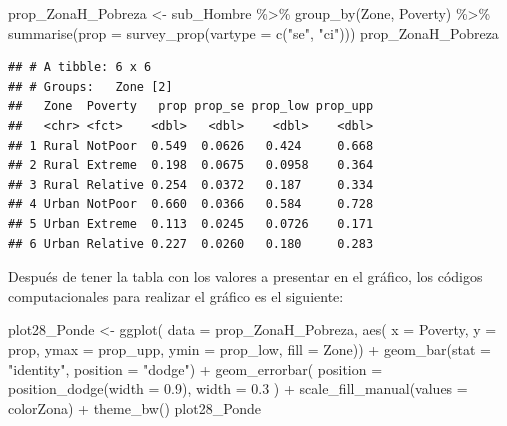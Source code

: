 \documentclass[
  12pt,
]{book}
\newenvironment{Shaded}{\begin{snugshade}}{\end{snugshade}}
\newcommand{\AttributeTok}[1]{\textcolor[rgb]{0.77,0.63,0.00}{#1}}
\newcommand{\FloatTok}[1]{\textcolor[rgb]{0.00,0.00,0.81}{#1}}
\newcommand{\FunctionTok}[1]{\textcolor[rgb]{0.00,0.00,0.00}{#1}}
\newcommand{\NormalTok}[1]{#1}
\newcommand{\OtherTok}[1]{\textcolor[rgb]{0.56,0.35,0.01}{#1}}
\newcommand{\SpecialCharTok}[1]{\textcolor[rgb]{0.00,0.00,0.00}{#1}}
\newcommand{\StringTok}[1]{\textcolor[rgb]{0.31,0.60,0.02}{#1}}
\begin{document}
\begin{Shaded}
\begin{Highlighting}[]
\NormalTok{prop\_ZonaH\_Pobreza }\OtherTok{\textless{}{-}}\NormalTok{ sub\_Hombre }\SpecialCharTok{\%\textgreater{}\%}
  \FunctionTok{group\_by}\NormalTok{(Zone, Poverty) }\SpecialCharTok{\%\textgreater{}\%}
  \FunctionTok{summarise}\NormalTok{(}\AttributeTok{prop =} \FunctionTok{survey\_prop}\NormalTok{(}\AttributeTok{vartype =} \FunctionTok{c}\NormalTok{(}\StringTok{"se"}\NormalTok{, }\StringTok{"ci"}\NormalTok{)))}
\NormalTok{prop\_ZonaH\_Pobreza}
\end{Highlighting}
\end{Shaded}

\begin{verbatim}
## # A tibble: 6 x 6
## # Groups:   Zone [2]
##   Zone  Poverty   prop prop_se prop_low prop_upp
##   <chr> <fct>    <dbl>   <dbl>    <dbl>    <dbl>
## 1 Rural NotPoor  0.549  0.0626   0.424     0.668
## 2 Rural Extreme  0.198  0.0675   0.0958    0.364
## 3 Rural Relative 0.254  0.0372   0.187     0.334
## 4 Urban NotPoor  0.660  0.0366   0.584     0.728
## 5 Urban Extreme  0.113  0.0245   0.0726    0.171
## 6 Urban Relative 0.227  0.0260   0.180     0.283
\end{verbatim}

Después de tener la tabla con los valores a presentar en el gráfico, los códigos computacionales para realizar el gráfico es el siguiente:

\begin{Shaded}
\begin{Highlighting}[]
\NormalTok{plot28\_Ponde }\OtherTok{\textless{}{-}} \FunctionTok{ggplot}\NormalTok{(}
  \AttributeTok{data =}\NormalTok{ prop\_ZonaH\_Pobreza,}
  \FunctionTok{aes}\NormalTok{(}
    \AttributeTok{x =}\NormalTok{ Poverty, }\AttributeTok{y =}\NormalTok{ prop,}
    \AttributeTok{ymax =}\NormalTok{ prop\_upp, }\AttributeTok{ymin =}\NormalTok{ prop\_low,}
    \AttributeTok{fill =}\NormalTok{ Zone)) }\SpecialCharTok{+} 
  \FunctionTok{geom\_bar}\NormalTok{(}\AttributeTok{stat =} \StringTok{"identity"}\NormalTok{, }\AttributeTok{position =} \StringTok{"dodge"}\NormalTok{) }\SpecialCharTok{+}
  \FunctionTok{geom\_errorbar}\NormalTok{(}
    \AttributeTok{position =} \FunctionTok{position\_dodge}\NormalTok{(}\AttributeTok{width =} \FloatTok{0.9}\NormalTok{),}
    \AttributeTok{width =} \FloatTok{0.3}
\NormalTok{  ) }\SpecialCharTok{+} \FunctionTok{scale\_fill\_manual}\NormalTok{(}\AttributeTok{values =}\NormalTok{ colorZona) }\SpecialCharTok{+}
  \FunctionTok{theme\_bw}\NormalTok{()}
\NormalTok{plot28\_Ponde}
\end{Highlighting}
\end{Shaded}
\end{document}
